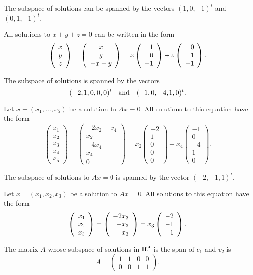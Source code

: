   \ans The subspace of solutions can be spanned by the vectors 
$(1,0,-1)^t$ and $(0,1,-1)^t$.

\soln All solutions to $x + y + z = 0$ can be written in the form
\[
\left(\begin{array}{r} x \\ y \\ z\end{array}\right) = \left(\begin{array}{c} x \\ y \\ -x-y\end{array}\right)
= x\left(\begin{array}{r} 1 \\ 0 \\ -1\end{array}\right) + z\left(\begin{array}{r} 0 \\ 1 \\ -1\end{array}\right).
\]

\ans The subspace of solutions is spanned by the vectors
\[
(-2,1,0,0,0)^t \quad\mbox{and}\quad (-1,0,-4,1,0)^t.
\]

\soln Let $x = (x_1,\dots ,x_5)$ be a solution to $Ax = 0$.  All
solutions to this equation have the form
\[
\left(\begin{array}{r} x_1 \\ x_2 \\ x_3 \\ x_4 \\ x_5
\end{array}\right) = \left(\begin{array}{c} -2x_2 - x_4 \\ x_2 \\
-4x_4 \\ x_4 \\ 0 \end{array}\right) = x_2\left(\begin{array}{r}
-2 \\ 1 \\ 0 \\ 0 \\ 0 \end{array}\right) +
x_4\left(\begin{array}{r} -1 \\ 0 \\ -4 \\ 1 \\ 0
\end{array}\right).
\]

\ans The subspace of solutions to $Ax = 0$ is spanned by the vector
$(-2,-1,1)^t$.

\soln Let $x = (x_1,x_2,x_3)$ be a solution to $Ax = 0$.  All solutions
to this equation have the form
\[
\left(\begin{array}{r} x_1 \\ x_2 \\ x_3\end{array}\right) = \left(\begin{array}{r} -2x_3 \\ -x_3 \\ x_3\end{array}\right) =
x_3\left(\begin{array}{r} -2 \\ -1 \\ 1\end{array}\right).
\]

\ans The matrix $A$ whose subspace of solutions in $\mbox{$\bf{R}$}^4$ is the span of
$v_1$ and $v_2$ is
\[
A = \left(\begin{array}{rrrr} 1 & 1 & 0 & 0 \\ 0 & 0 & 1 & 1
\end{array}\right).
\]

